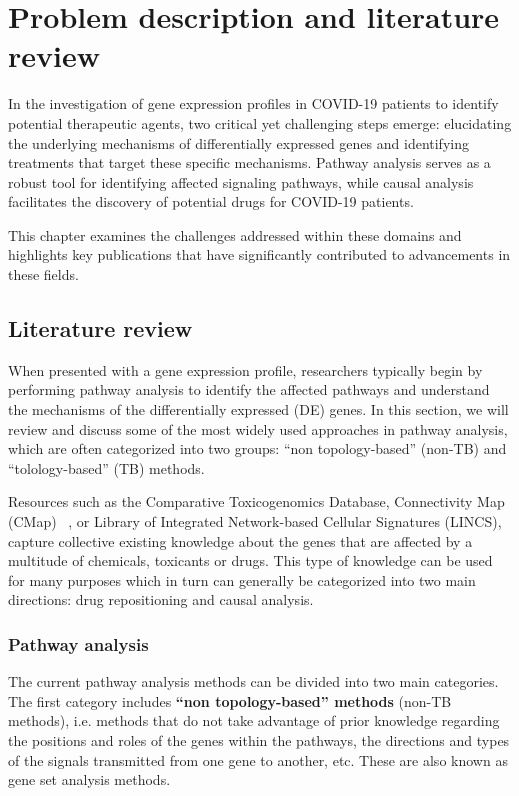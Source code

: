 \section{Problem description and literature review}
In the investigation of gene expression profiles in COVID-19 patients to identify potential therapeutic agents, two critical yet challenging steps emerge: elucidating the underlying mechanisms of differentially expressed genes and identifying treatments that target these specific mechanisms. Pathway analysis serves as a robust tool for identifying affected signaling pathways, while causal analysis facilitates the discovery of potential drugs for COVID-19 patients. 

This chapter examines the challenges addressed within these domains and highlights key publications that have significantly contributed to advancements in these fields.



\subsection{Literature review}


When presented with a gene expression profile, researchers typically begin by performing pathway analysis to identify the affected pathways and understand the mechanisms of the differentially expressed (DE) genes. In this section, we will review and discuss some of the most widely used approaches in pathway analysis, which are often categorized into two groups: ``non topology-based''  (non-TB) and ``tolology-based'' (TB) methods.

Resources such as the Comparative Toxicogenomics Database, Connectivity Map (CMap) ~\cite{lamb2007connectivity, lamb2006connectivity}, or Library of Integrated Network-based Cellular Signatures (LINCS), capture collective existing knowledge about the genes that are affected by a multitude of  chemicals, toxicants or drugs. This type of knowledge can be used for many purposes which in turn can generally be categorized into two main directions: drug repositioning and causal analysis.



\subsubsection{Pathway analysis}
The current pathway analysis methods can be divided into two main categories. 
The first category includes \textbf{``non topology-based'' methods} (non-TB methods), i.e. methods  that do not take advantage of prior knowledge regarding the positions and roles of the genes within the pathways, the directions and types of the signals transmitted from one gene to another, etc.  
These are also known as gene set analysis methods. 

